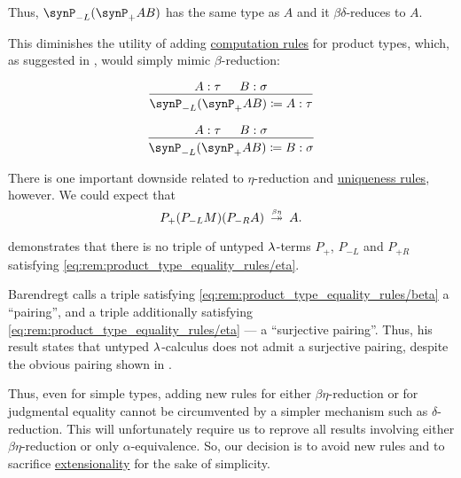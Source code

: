\begin{remark}
  Thus, \( \synP_{-L} (\synP_+ AB) \) has the same type as \( A \) and it \( \beta\delta \)-reduces to \( A \).

  This diminishes the utility of adding \hyperref[rem:type_theory_rule_classification/equality/computation]{computation rules} for product types, which, as suggested in \cite[\S 4.3.1]{Mimram2020ProgramEqualsProof}, would simply mimic \( \beta \)-reduction:
  \begin{paracol}{2}
    \begin{leftcolumn}
      \begin{equation*}
        \begin{prooftree}
          \hypo{ A: \tau }
          \hypo{ B: \sigma }
          \infer2{ \synP_{-L} (\synP_+ AB) \coloneqq A: \tau }
        \end{prooftree}
      \end{equation*}
    \end{leftcolumn}

    \begin{rightcolumn}
      \begin{equation*}
        \begin{prooftree}
          \hypo{ A: \tau }
          \hypo{ B: \sigma }
          \infer2{ \synP_{-L} (\synP_+ AB) \coloneqq B: \sigma }
        \end{prooftree}
      \end{equation*}
    \end{rightcolumn}
  \end{paracol}

  There is one important downside related to \( \eta \)-reduction and \hyperref[rem:type_theory_rule_classification/equality/uniqueness]{uniqueness rules}, however. We could expect that
  \begin{equation}\label{eq:rem:product_type_equality_rules/eta}
    P_+ (P_{-L} M) (P_{-R} A) \redrel*{\beta\eta} A.
  \end{equation}

   demonstrates that there is no triple of untyped \( \mathrm{\lambda} \)-terms \( P_+ \), \( P_{-L} \) and \( P_{+R} \) satisfying \eqref{eq:rem:product_type_equality_rules/eta}.

  Barendregt calls a triple satisfying \eqref{eq:rem:product_type_equality_rules/beta} a \enquote{pairing}, and a triple additionally satisfying \eqref{eq:rem:product_type_equality_rules/eta} --- a \enquote{surjective pairing}. Thus, his result states that untyped \( \mathrm{\lambda} \)-calculus does not admit a surjective pairing, despite the obvious pairing shown in .

  Thus, even for simple types, adding new rules for either \( \beta\eta \)-reduction or for judgmental equality cannot be circumvented by a simpler mechanism such as \( \delta \)-reduction. This will unfortunately require us to reprove all results involving either \( \beta\eta \)-reduction or only \( \alpha \)-equivalence. So, our decision is to avoid new rules and to sacrifice \hyperref[con:extensionality]{extensionality} for the sake of simplicity.
\end{remark}

